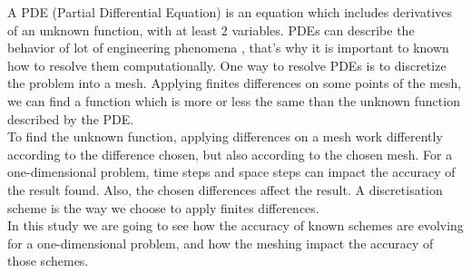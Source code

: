 \documentclass{article}
\begin{document}
        A PDE (Partial Differential Equation) is an equation which includes derivatives of an unknown function, with at least 2 variables.
        PDEs can describe the behavior of lot of engineering phenomena \cite{pde}, that's why it is important to 
        known how to resolve them computationally. One way to resolve PDEs is to discretize the problem into
        a mesh. Applying finites differences on some points of the mesh, we can find a function
        which is more or less the same than the unknown function described by the PDE.
        \\
        To find the unknown function, applying differences on a mesh work differently according to the difference chosen, 
        but also according to the chosen mesh. For a one-dimensional problem, time steps and space steps can impact the accuracy
        of the result found. Also, the chosen differences affect the result. A discretisation scheme is the way we choose to apply
        finites differences.
        \\
        In this study we are going to see how the accuracy of known schemes are evolving for a one-dimensional problem, and how the 
        meshing impact the accuracy of those schemes.
        
        
    
    
        \newpage
\end{document}
